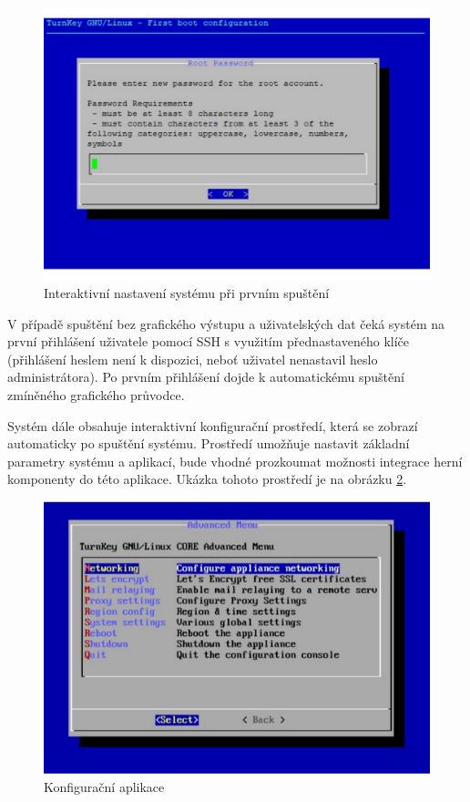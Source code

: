 \begin{figure}[h]
    \centering
    \includegraphics[width=1\linewidth]{chapters/images/root-pass.pdf}
    \caption{Interaktivní nastavení systému při prvním spuštění \cite{turnkey}}
    \label{fig:inithooks-password}
\end{figure}

V případě spuštění bez grafického výstupu a uživatelských dat čeká systém na první přihlášení uživatele pomocí SSH s využitím přednastaveného klíče (přihlášení heslem
není k dispozici, neboť uživatel nenastavil heslo administrátora). Po prvním přihlášení dojde k automatickému spuštění zmíněného grafického průvodce.

Systém dále obsahuje interaktivní konfigurační prostředí, která se zobrazí automaticky po spuštění systému.
Prostředí umožňuje nastavit základní parametry systému a aplikací, bude vhodné prozkoumat možnosti integrace herní komponenty do této aplikace.
Ukázka tohoto prostředí je na obrázku \ref{fig:confconsole}.

\begin{figure}[h]
    \centering
    \includegraphics[width=1\linewidth]{chapters/images/confconsole.pdf}
    \caption{Konfigurační aplikace \cite{turnkey}}
    \label{fig:confconsole}
\end{figure}

